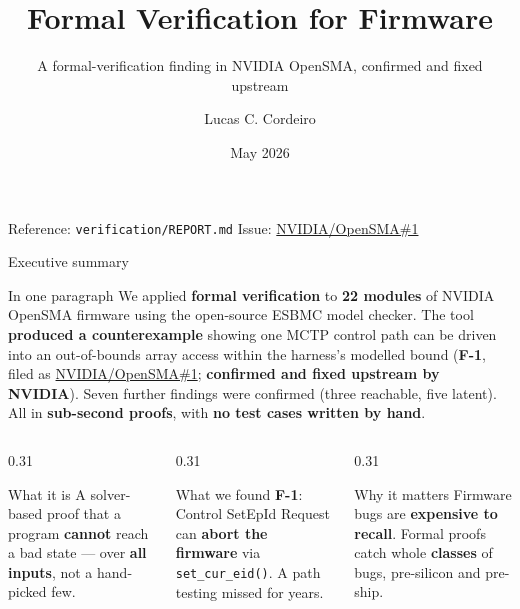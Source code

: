 \documentclass[aspectratio=169,11pt]{beamer}
\title[Formal Verification for Firmware]{Formal Verification for Firmware}
\subtitle{A formal-verification finding in NVIDIA OpenSMA, confirmed and fixed upstream}
\author[Cordeiro]{Lucas C. Cordeiro}
\institute[Univ.\ of Manchester]{University of Manchester \\ \textit{lucas.cordeiro@manchester.ac.uk}}
\date{May 2026}
\newcommand{\hil}[1]{\textbf{\textcolor{nvgreendark}{#1}}}
\newcommand{\bad}[1]{\textbf{\textcolor{nvred}{#1}}}
\begin{document}
\begin{frame}[plain]
  \titlepage
  \begin{center}
    \scriptsize\textcolor{nvgray}{Reference: \texttt{verification/REPORT.md} \textbar{} Issue: \href{https://github.com/NVIDIA/OpenSMA/issues/1}{NVIDIA/OpenSMA\#1}}
  \end{center}
\end{frame}

\begin{frame}{Executive summary}
  \begin{block}{In one paragraph}
    \small
    We applied \hil{formal verification} to \hil{22 modules} of NVIDIA OpenSMA firmware
    using the open-source ESBMC model checker. The tool \hil{produced a counterexample}
    showing one MCTP control path can be driven into an out-of-bounds array access
    within the harness's modelled bound (\bad{F-1}, filed as
    \href{https://github.com/NVIDIA/OpenSMA/issues/1}{NVIDIA/OpenSMA\#1};
    \hil{confirmed and fixed upstream by NVIDIA}).
    Seven further findings were confirmed (three reachable, five latent). All in \hil{sub-second proofs},
    with \hil{no test cases written by hand}.
  \end{block}

  \vspace{0.3em}
  \begin{columns}[T,onlytextwidth]
    \begin{column}{0.31\textwidth}
      \begin{block}{What it is}
        \footnotesize
        A solver-based proof that a program \hil{cannot} reach a bad state — over
        \hil{all inputs}, not a hand-picked few.
      \end{block}
    \end{column}
    \begin{column}{0.31\textwidth}
      \begin{block}{What we found}
        \footnotesize
        \bad{F-1}: Control SetEpId Request can \hil{abort the firmware}
        via \texttt{set\_cur\_eid()}. A path testing missed for years.
      \end{block}
    \end{column}
    \begin{column}{0.31\textwidth}
      \begin{block}{Why it matters}
        \footnotesize
        Firmware bugs are \hil{expensive to recall}. Formal proofs catch
        whole \hil{classes} of bugs, pre-silicon and pre-ship.
      \end{block}
    \end{column}
  \end{columns}
\end{frame}
\end{document}
